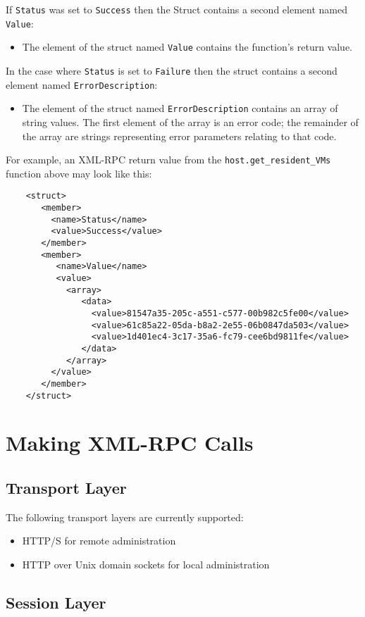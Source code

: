 If {\tt Status} was set to {\tt Success} then the Struct contains a second
element named {\tt Value}:
\begin{itemize}
\item The element of the struct named {\tt Value} contains the function's return value.
\end{itemize}

In the case where {\tt Status} is set to {\tt Failure} then
the struct contains a second element named {\tt ErrorDescription}:
\begin{itemize}
\item The element of the struct named {\tt ErrorDescription} contains
an array of string values. The first element of the array is an error code;
the remainder of the array are strings representing error parameters relating
to that code.
\end{itemize}

For example, an XML-RPC return value from the {\tt host.get\_resident\_VMs}
function above
may look like this:
\begin{verbatim}
    <struct>
       <member>
         <name>Status</name>
         <value>Success</value>
       </member>
       <member>
          <name>Value</name>
          <value>
            <array>
               <data>
                 <value>81547a35-205c-a551-c577-00b982c5fe00</value>
                 <value>61c85a22-05da-b8a2-2e55-06b0847da503</value>
                 <value>1d401ec4-3c17-35a6-fc79-cee6bd9811fe</value>
               </data>
            </array>
         </value>
       </member>
    </struct>
\end{verbatim}

\section{Making XML-RPC Calls}

\subsection{Transport Layer}

The following transport layers are currently supported:
\begin{itemize}
\item HTTP/S for remote administration
\item HTTP over Unix domain sockets for local administration
\end{itemize}

\subsection{Session Layer}

